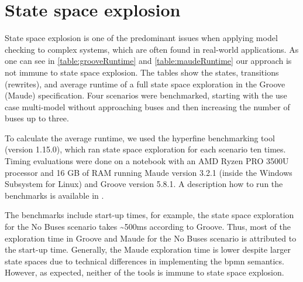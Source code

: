 \documentclass{jot}
\begin{document}
\section{State space explosion} \label{sec:state_space_explosion}
State space explosion is one of the predominant issues when applying model checking to complex systems, which are often found in real-world applications.
As one can see in \cref{table:grooveRuntime} and \cref{table:maudeRuntime} our approach is not immune to state space explosion.
The tables show the states, transitions (rewrites), and average runtime of a full state space exploration in the Groove (Maude) specification.
Four scenarios were benchmarked, starting with the use case multi-model without approaching buses and then increasing the number of buses up to three.

To calculate the average runtime, we used the hyperfine benchmarking tool \cite{peterHyperfine2022} (version 1.15.0), which ran state space exploration for each scenario ten times.
Timing evaluations were done on a notebook with an AMD Ryzen PRO 3500U processor and 16 GB of RAM running Maude version 3.2.1 (inside the Windows Subsystem for Linux) and Groove version 5.8.1.
A description how to run the benchmarks is available in \cite{krauterArtifactsBehavioralConsistency2022}.

The benchmarks include start-up times, for example, the state space exploration for the \textsf{No Buses} scenario takes \textasciitilde 500ms according to Groove.
Thus, most of the exploration time in Groove and Maude for the \textsf{No Buses} scenario is attributed to the start-up time.
Generally, the Maude exploration time is lower despite larger state spaces due to technical differences in implementing the \gls*{bpmn} semantics.
However, as expected, neither of the tools is immune to state space explosion.
\end{document}
